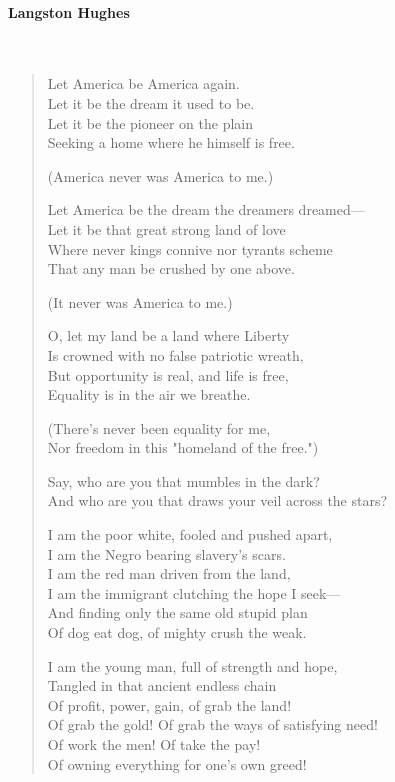 \documentclass[12pt, openany, letterpaper]{memoir}
\begin{document}
\paragraph{Langston Hughes}~
\begin{verse}
	Let America be America again.\\
	Let it be the dream it used to be.\\
	Let it be the pioneer on the plain\\
	Seeking a home where he himself is free.
	
	(America never was America to me.)
	
	Let America be the dream the dreamers dreamed—\\
	Let it be that great strong land of love\\
	Where never kings connive nor tyrants scheme\\
	That any man be crushed by one above.
	
	(It never was America to me.)
	
	O, let my land be a land where Liberty\\
	Is crowned with no false patriotic wreath,\\
	But opportunity is real, and life is free,\\
	Equality is in the air we breathe.
	
	(There's never been equality for me,\\
	Nor freedom in this "homeland of the free.")
	
	Say, who are you that mumbles in the dark?\\
	And who are you that draws your veil across the stars?
	
	I am the poor white, fooled and pushed apart,\\
	I am the Negro bearing slavery's scars.\\
	I am the red man driven from the land,\\
	I am the immigrant clutching the hope I seek—\\
	And finding only the same old stupid plan\\
	Of dog eat dog, of mighty crush the weak.
	
	I am the young man, full of strength and hope,\\
	Tangled in that ancient endless chain\\
	Of profit, power, gain, of grab the land!\\
	Of grab the gold! Of grab the ways of satisfying need!\\
	Of work the men! Of take the pay!\\
	Of owning everything for one's own greed!
	

\end{verse}
\end{document}

